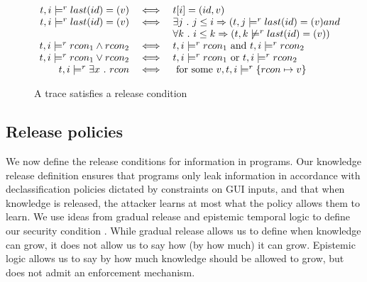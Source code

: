 \documentclass[conference]{IEEEtran}
\theoremstyle{definition}
\newcommand{\aset}[1]{\{#1\}}
\newcommand{\modelsrcon}{\models^{r}}
\newcommand{\tr}{t}
\begin{document}
\begin{figure}
  \begin{displaymath}
    \begin{array}{rcl}

      \tr, i \modelsrcon last(id) = ( v ) & \iff &
      \tr[i] = (id, v) \\

      \tr, i \modelsrcon last(id) = ( v ) & \iff & 
      \exists j ~.~ j \leq i \Rightarrow (\tr, j \modelsrcon last(id) = ( v ) and \\
      & & \forall k ~.~ i \leq k \Rightarrow (\tr, k \not \modelsrcon last(id) = ( v )) \\

      \tr, i \modelsrcon rcon_1 \wedge rcon_2 & \iff & 
      \tr, i \modelsrcon rcon_1 \hbox{ and } \tr, i \modelsrcon rcon_2 \\
      
      \tr, i \modelsrcon rcon_1 \lor rcon_2 & \iff & 
      \tr, i \modelsrcon rcon_1 \hbox{ or } \tr, i \modelsrcon rcon_2 \\

      \tr, i \modelsrcon \exists x ~.~ rcon & \iff & 
      \hbox{ for some } v, \tr, i \modelsrcon \aset{rcon \mapsto v} \\


    \end{array}
  \end{displaymath}
  \caption{A trace satisfies a release condition}
\end{figure}

\subsection{Release policies}

We now define the release conditions for information in programs.  Our
knowledge release definition ensures that programs only leak
information in accordance with declassification policies dictated by
constraints on GUI inputs, and that when knowledge is released, the
attacker learns at most what the policy allows them to learn.  We use
ideas from gradual release \cite{Askarov:2007} and epistemic temporal
logic to define our security condition \cite{Ahmad:13}.  While gradual
release allows us to define when knowledge can grow, it does not allow
us to say how (by how much) it can grow.  Epistemic logic allows us to
say by how much knowledge should be allowed to grow, but does not
admit an enforcement mechanism.
\end{document}
